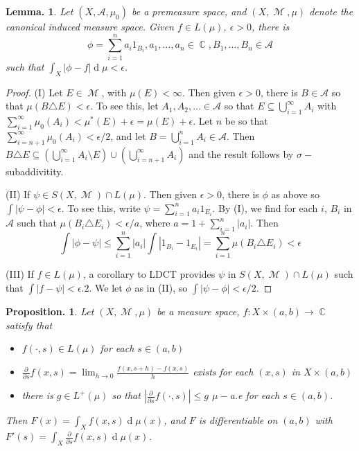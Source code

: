 \documentclass[11pt, a4paper]{memoir}
\DeclareMathOperator{\C}{{\mathbb{C}}}
\theoremstyle{change}
\newtheorem{lemma}[theorem]{Lemma.}
\newtheorem{proposition}[theorem]{Proposition.}
\theoremstyle{plain}
\theoremstyle{nonumberplain}
\newtheorem{proof}{Proof}
\DeclareMathOperator{\M}{{\mathcal{M}}}
\renewcommand{\d}[1]{\ensuremath{\operatorname{d}\!{#1}}}
\numberwithin{equation}{section}
\begin{document}
\begin{lemma}
    Let $(X,\mathcal{A},\mu_0)$ be a premeasure space, and $(X,\M,\mu)$ denote the canonical induced measure space.
    Given $f\in L(\mu)$, $\epsilon>0$, there is
    \begin{equation*}
        \phi=\sum\limits_{i=1}^n a_i1_{B_i},a_1,\ldots,a_n\in\C,B_1,\ldots,B_n\in\mathcal{A}
    \end{equation*}
    such that $\int_X|\phi-f|\d{\mu}<\epsilon$.
\end{lemma}
\begin{proof}
    (I) Let $E\in\M$, with $\mu(E)<\infty$.
    Then given $\epsilon>0$, there is $B\in\mathcal{A}$ so that $\mu(B\triangle E)<\epsilon$.
    To see this, let $A_1,A_2,\ldots\in\mathcal{A}$ so that $E\subseteq\bigcup_{i=1}^\infty A_i$ with $\sum_{i=1}^\infty \mu_0(A_i)<\mu^*(E)+\epsilon=\mu(E)+\epsilon$.
    Let $n$ be so that $\sum_{i=n+1}^\infty \mu_0(A_i)<\epsilon/2$, and let $B=\bigcup_{i=1}^n A_i\in\mathcal{A}$.
    Then $B\triangle E\subseteq\left(\bigcup_{i=1}^\infty A_i\setminus E\right)\cup\left(\bigcup_{i=n+1}^\infty A_i\right)$ and the result follows by $\sigma-$subaddivitity.

    (II) If $\psi\in S(X,\M)\cap L(\mu)$.
    Then given $\epsilon>0$, there is $\phi$ as above so $\int|\psi-\phi|<\epsilon$.
    To see this, write $\psi=\sum_{i=1}^n a_i1_{E_i}$.
    By (I), we find for each $i$, $B_i$ in $\mathcal{A}$ such that $\mu(B_i\triangle E_i)<\epsilon/a$, where $a=1+\sum_{i=1}^n|a_i|$.
    Then
    \begin{equation*}
        \int|\phi-\psi|\leq\sum_{i=1}^n|a_i|\int|1_{B_i}-1_{E_i}|=\sum_{i=1}^n \mu(B_i\triangle E_i)<\epsilon
    \end{equation*}

    (III) If $f\in L(\mu)$, a corollary to LDCT provides $\psi$ in $S(X,\M)\cap L(\mu)$ such that $\int|f-\psi|<\epsilon.2$.
    We let $\phi$ as in (II), so $\int|\psi-\phi|<\epsilon/2$.
\end{proof}
\begin{proposition}
    Let $(X,\M,\mu)$ be a measure space, $f:X\times(a,b)\to\C$ satisfy that
    \begin{itemize}[nolistsep]
        \item $f(\cdot,s)\in L(\mu)$ for each $s\in(a,b)$
        \item $\frac{\partial}{\partial s}f(x,s)=\lim_{h\to 0}\frac{f(x,s+h)-f(x,s)}{h}$ exists for each $(x,s)$ in $X\times(a,b)$
        \item there is $g\in L^+(\mu)$ so that $\left\lvert\frac{\partial}{\partial s}f(\cdot,s)\right\rvert\leq g$ $\mu-$a.e for each $s\in(a,b)$.
    \end{itemize}
    Then $F(x)=\int_X f(x,s)\d{\mu(x)}$, and $F$ is differentiable on $(a,b)$ with $F'(s)=\int_X\frac{\partial}{\partial s}f(x,s)\d{\mu(x)}$.
\end{proposition}
\end{document}
